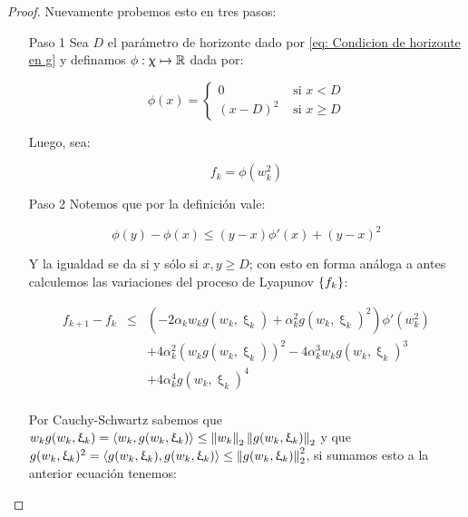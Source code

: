 \begin{proof}
	Nuevamente probemos esto en tres pasos:
	
	\begin{enumerate}
		\item [Paso 1] Sea $D$ el par\'ametro de horizonte dado por \ref{eq: Condicion de horizonte en g} y definamos $\phi: \upchi \mapsto {\mathbb{R}}$ dada por:
		
		\begin{equation*}
		\phi(x) = \left\lbrace
		\begin{array}{cc}
		 0 & \text{ si } x < D \\
		 (x - D)^2 & \text{ si } x \geq D
		\end{array}\right.
		\end{equation*}
		
		Luego, sea:
		
		\begin{equation*}
			f_k = \phi\left(w_k^2\right)
		\end{equation*}
		
		\item [Paso 2] Notemos que por la definici\'on vale:
		
		\begin{equation*}
			\phi(y) - \phi(x) \leq \left(y - x\right)\phi\prime(x) + \left(y-x\right)^2
		\end{equation*}
		
		Y la igualdad se da si y s\'olo si $x,y \geq D$; con esto en forma an\'aloga a antes calculemos las variaciones del proceso de Lyapunov $\left\lbrace f_k\right\rbrace$:
		
		\begin{equation}
		\label{eq: Condicion de proceso de lyapunov, confinamiento global}
		\begin{array}{rcl}
			f_{k+1} - f_k & \leq & \left(-2 \alpha_k w_k g(w_k, \upxi_{k}) + \alpha_k^2 g(w_k, \upxi_{k})^2\right) \phi'(w_k^2) \\ 
			& & + 4 \alpha_k^2 \left(w_kg(w_k, \upxi_{k})\right)^2 -4 \alpha_k^3 w_k g(w_k, \upxi_{k})^3 \\
			 & &  + 4 \alpha_k^4g(w_k, \upxi_{k})^4 \\
		\end{array}
		\end{equation}
		
		Por Cauchy-Schwartz sabemos que $w_k g(w_k, \upxi_{k}) = \left\langle w_k, g(w_k, \upxi_{k})\right\rangle \leq \left\lVert w_k\right\rVert_2 \left\lVert g(w_k, \upxi_{k})\right\rVert_2$ y que $g(w_k, \upxi_{k})^2 = \left\langle g(w_k, \upxi_{k}), g(w_k, \upxi_{k})\right\rangle \leq \left\lVert g(w_k, \upxi_{k})\right\rVert_2^2$, si sumamos esto a la anterior ecuaci\'on tenemos:
		

\end{enumerate}
\end{proof}
